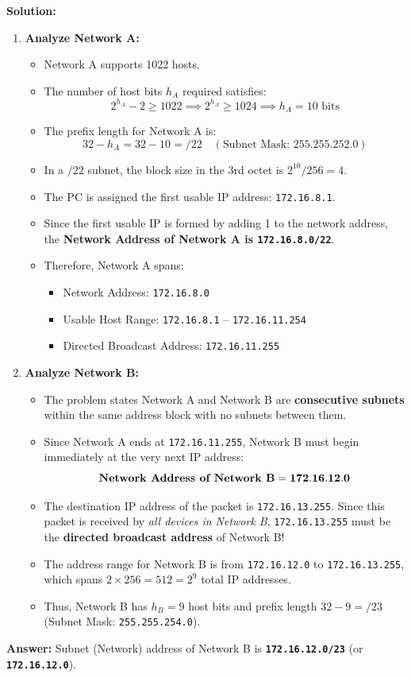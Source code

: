 \documentclass[11pt,a4paper]{article}
\begin{document}
\textbf{Solution:}
\begin{enumerate}
    \item \textbf{Analyze Network A:}
    \begin{itemize}
        \item Network A supports 1022 hosts.
        \item The number of host bits $h_A$ required satisfies:
        \[
        2^{h_A} - 2 \ge 1022 \implies 2^{h_A} \ge 1024 \implies h_A = 10\text{ bits}
        \]
        \item The prefix length for Network A is:
        \[
        32 - h_A = 32 - 10 = /22 \quad (\text{Subnet Mask: } 255.255.252.0)
        \]
        \item In a $/22$ subnet, the block size in the 3rd octet is $2^{10}/256 = 4$.
        \item The PC is assigned the first usable IP address: \texttt{172.16.8.1}.
        \item Since the first usable IP is formed by adding 1 to the network address, the \textbf{Network Address of Network A is \texttt{172.16.8.0/22}}.
        \item Therefore, Network A spans:
        \begin{itemize}
            \item Network Address: \texttt{172.16.8.0}
            \item Usable Host Range: \texttt{172.16.8.1} -- \texttt{172.16.11.254}
            \item Directed Broadcast Address: \texttt{172.16.11.255}
        \end{itemize}
    \end{itemize}

    \item \textbf{Analyze Network B:}
    \begin{itemize}
        \item The problem states Network A and Network B are \textbf{consecutive subnets} within the same address block with no subnets between them.
        \item Since Network A ends at \texttt{172.16.11.255}, Network B must begin immediately at the very next IP address:
        \[
        \text{\textbf{Network Address of Network B}} = \mathbf{172.16.12.0}
        \]
        \item The destination IP address of the packet is \texttt{172.16.13.255}. Since this packet is received by \emph{all devices in Network B}, \texttt{172.16.13.255} must be the \textbf{directed broadcast address} of Network B!
        \item The address range for Network B is from \texttt{172.16.12.0} to \texttt{172.16.13.255}, which spans $2 \times 256 = 512 = 2^9$ total IP addresses.
        \item Thus, Network B has $h_B = 9$ host bits and prefix length $32 - 9 = /23$ (Subnet Mask: \texttt{255.255.254.0}).
    \end{itemize}
\end{enumerate}
\textbf{Answer:} Subnet (Network) address of Network B is \textbf{\texttt{172.16.12.0/23}} (or \textbf{\texttt{172.16.12.0}}).
\end{document}
